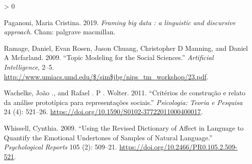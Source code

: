 \documentclass[
]{book}
\newlength{\cslhangindent}
\newenvironment{CSLReferences}[2] %
 {%
  \setlength{\parindent}{0pt}
  \ifodd #1 \everypar{\setlength{\hangindent}{\cslhangindent}}\ignorespaces\fi
  \ifnum #2 > 0
  \setlength{\parskip}{#2\baselineskip}
  \fi
 }%
 {}
\begin{document}
\begin{CSLReferences}{1}{0}
\leavevmode\hypertarget{ref-Paganoni2019}{}%
Paganoni, Maria Cristina. 2019. \emph{{Framing big data : a linguistic and discursive approach}}. Cham: palgrave macmillan.

\leavevmode\hypertarget{ref-Ramage2009}{}%
Ramage, Daniel, Evan Rosen, Jason Chuang, Christopher D Manning, and Daniel A Mcfarland. 2009. {``{Topic Modeling for the Social Sciences}.''} \emph{Artificial Intelligence}, 2--5. \url{http://www.umiacs.umd.edu/$/sim$jbg/nips_tm_workshop/23.pdf}.

\leavevmode\hypertarget{ref-Wachelke2011}{}%
Wachelke, João ., and Rafael . P . Wolter. 2011. {``{Crit{é}rios de constru{ç}{ã}o e relato da an{á}lise protot{í}pica para representa{ç}{õ}es sociais}.''} \emph{Psicologia: Teoria e Pesquisa} 24 (4): 521--26. \url{https://doi.org/10.1590/S0102-37722011000400017}.

\leavevmode\hypertarget{ref-Whissell2009}{}%
Whissell, Cynthia. 2009. {``{Using the Revised Dictionary of Affect in Language to Quantify the Emotional Undertones of Samples of Natural Language}.''} \emph{Psychological Reports} 105 (2): 509--21. \url{https://doi.org/10.2466/PR0.105.2.509-521}.

\end{CSLReferences}
\end{document}

